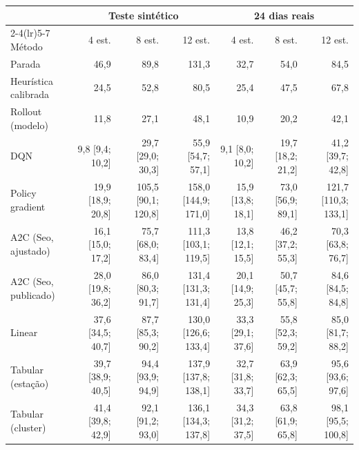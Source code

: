 \begin{tabular}{lrrrrrr}
\toprule
& \multicolumn{3}{c}{Teste sintético} & \multicolumn{3}{c}{24 dias reais} \\
\cmidrule(lr){2-4}\cmidrule(lr){5-7}
Método & 4 est. & 8 est. & 12 est. & 4 est. & 8 est. & 12 est. \\
\midrule
Parada & 46,9 & 89,8 & 131,3 & 32,7 & 54,0 & 84,5 \\
Heurística calibrada & 24,5 & 52,8 & 80,5 & 25,4 & 47,5 & 67,8 \\
Rollout (modelo) & 11,8 & 27,1 & 48,1 & 10,9 & 20,2 & 42,1 \\
DQN & 9,8 [9,4; 10,2] & 29,7 [29,0; 30,3] & 55,9 [54,7; 57,1] & 9,1 [8,0; 10,2] & 19,7 [18,2; 21,2] & 41,2 [39,7; 42,8] \\
Policy gradient & 19,9 [18,9; 20,8] & 105,5 [90,1; 120,8] & 158,0 [144,9; 171,0] & 15,9 [13,8; 18,1] & 73,0 [56,9; 89,1] & 121,7 [110,3; 133,1] \\
A2C (Seo, ajustado) & 16,1 [15,0; 17,2] & 75,7 [68,0; 83,4] & 111,3 [103,1; 119,5] & 13,8 [12,1; 15,5] & 46,2 [37,2; 55,3] & 70,3 [63,8; 76,7] \\
A2C (Seo, publicado) & 28,0 [19,8; 36,2] & 86,0 [80,3; 91,7] & 131,4 [131,3; 131,4] & 20,1 [14,9; 25,3] & 50,7 [45,7; 55,8] & 84,6 [84,5; 84,8] \\
Linear & 37,6 [34,5; 40,7] & 87,7 [85,3; 90,2] & 130,0 [126,6; 133,4] & 33,3 [29,1; 37,6] & 55,8 [52,3; 59,2] & 85,0 [81,7; 88,2] \\
Tabular (estação) & 39,7 [38,9; 40,5] & 94,4 [93,9; 94,9] & 137,9 [137,8; 138,1] & 32,7 [31,8; 33,7] & 63,9 [62,3; 65,5] & 95,6 [93,6; 97,6] \\
Tabular (cluster) & 41,4 [39,8; 42,9] & 92,1 [91,2; 93,0] & 136,1 [134,3; 137,8] & 34,3 [31,2; 37,5] & 63,8 [61,9; 65,8] & 98,1 [95,5; 100,8] \\
\bottomrule
\end{tabular}
